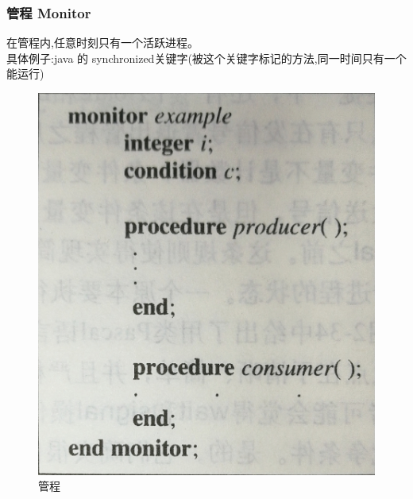 \documentclass[UTF8,a4paper]{ctexart}
\begin{document}
      \subsubsection{管程 Monitor}
      在管程内,任意时刻只有一个活跃进程。\\
      具体例子:java 的 synchronized关键字(被这个关键字标记的方法,同一时间只有一个能运行)
      \begin{figure}[H]\centering
        \includegraphics[scale = 0.1]{assets/ModernOperatingSystems_f64a5.png}
        \caption{管程}
      \end{figure}
\end{document}
